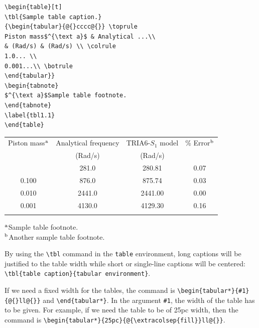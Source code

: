 \begin{verbatim}
\begin{table}[t]
\tbl{Sample table caption.}
{\begin{tabular}{@{}cccc@{}} \toprule
Piston mass$^{\text a}$ & Analytical ...\\
& (Rad/s) & (Rad/s) \\ \colrule
1.0... \\
0.001...\\ \botrule
\end{tabular}}
\begin{tabnote}
$^{\text a}$Sample table footnote.
\end{tabnote}
\label{tbl1.1}
\end{table}
\end{verbatim}

\begin{table}[t]
{\begin{tabular}{@{}cccc@{}} \toprule
Piston mass$^{\text a}$ & Analytical frequency & TRIA6-$S_1$ model & \% Error$^{\text b}$ \\
& (Rad/s) & (Rad/s) \\ \colrule
1.000 & \hphantom{0}281.0 & \hphantom{0}280.81 & 0.07 \\
0.100 & \hphantom{0}876.0 & \hphantom{0}875.74 & 0.03 \\
0.010 & 2441.0 & 2441.00 & 0.00 \\
0.001 & 4130.0 & 4129.30 & 0.16\\ \botrule
\end{tabular}
}
\begin{tabnote}
$^{\text a}$Sample table footnote.\\
$^{\text b}$Another sample table footnote.
\end{tabnote}
\label{tbl1.1}
\end{table}

By using the \verb|\tbl| command in the \verb|table| environment, long captions will
be justified to the table width while short or single-line captions
will be centered: \verb|\tbl{table caption}{tabular environment}|.

If we need a fixed width for the tables, the command is
\verb|\begin{tabular*}{#1}{@{}ll@{}}| and \verb|\end{tabular*}|.
In the argument \verb|#1|, the width of the table has to be given.
For example, if we need the table to be of 25pc width, then the command is
\verb|\begin{tabular*}{25pc}{@{\extracolsep{fill}}ll@{}}|.

